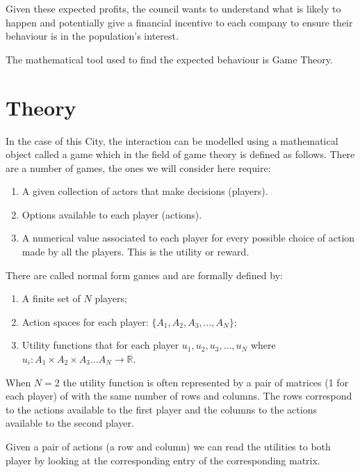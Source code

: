 Given these expected profits, the council wants to understand what is likely to
happen and potentially give a financial incentive to each company to ensure
their behaviour is in the population's interest.

The mathematical tool used to find the expected behaviour is Game Theory.

\section{Theory}\label{sec:theory}

In the case of this City, the interaction can be modelled using a mathematical
object called a game which in the field of game theory is defined as follows.
There are a number of games, the ones we will consider here require:

\begin{enumerate}
    \item A given collection of actors that make decisions (players).
    \item Options available to each player (actions).
    \item A numerical value associated to each player for every possible
        choice of action made by all the players. This is the utility or reward.
\end{enumerate}

There are called normal form games and are formally defined by:

\begin{enumerate}
    \item A finite set of \(N\) players;
    \item Action spaces for each player: \(\{A_1, A_2, A_3, \dots, A_N\}\);
    \item Utility functions that for each player \(u_1, u_2, u_3, \dots, u_N\)
        where \(u_i:A_1\times A_2 \times A_3 \dots A_N \to \mathbb{R}\).
\end{enumerate}

When \(N=2\) the utility function is often represented by a pair of matrices (1
for each player) of with the same number of rows and columns. The rows
correspond to the actions available to the first player and the columns to the
actions available to the second player.

Given a pair of actions (a row and column) we can read the utilities to both
player by looking at the corresponding entry of the corresponding matrix.


